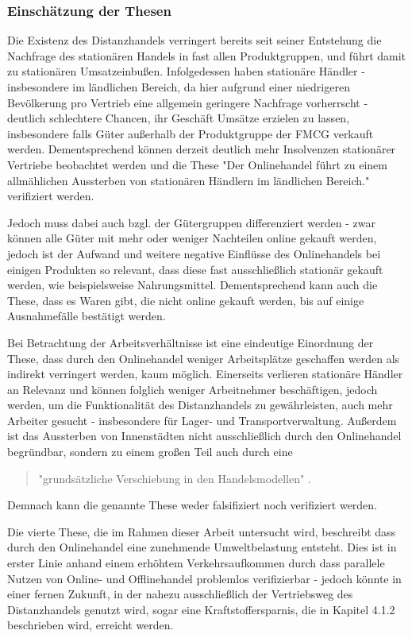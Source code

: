  
\subsubsection{Einschätzung der Thesen}

Die Existenz des Distanzhandels verringert bereits seit seiner Entstehung die Nachfrage des stationären Handels in fast allen Produktgruppen, und führt damit zu stationären Umsatzeinbußen. Infolgedessen haben stationäre Händler - insbesondere im ländlichen Bereich, da hier aufgrund einer niedrigeren Bevölkerung pro Vertrieb eine allgemein geringere Nachfrage vorherrscht - deutlich schlechtere Chancen, ihr Geschäft Umsätze erzielen zu lassen, insbesondere falls Güter außerhalb der Produktgruppe der \ac{FMCG} verkauft werden. Dementsprechend können derzeit deutlich mehr Insolvenzen stationärer Vertriebe beobachtet werden und die These "Der Onlinehandel führt zu einem allmählichen Aussterben von stationären Händlern im ländlichen Bereich." verifiziert werden.

Jedoch muss dabei auch bzgl. der Gütergruppen differenziert werden - zwar können alle Güter mit mehr oder weniger Nachteilen online gekauft werden, jedoch ist der Aufwand und weitere negative Einflüsse des Onlinehandels bei einigen Produkten so relevant, dass diese fast ausschließlich stationär gekauft werden, wie beispielsweise Nahrungsmittel. Dementsprechend kann auch die These, dass es Waren gibt, die nicht online gekauft werden, bis auf einige Ausnahmefälle bestätigt werden.

Bei Betrachtung der Arbeitsverhältnisse ist eine eindeutige Einordnung der These, dass durch den Onlinehandel weniger Arbeitsplätze geschaffen werden als indirekt verringert werden, kaum möglich. Einerseits verlieren stationäre Händler an Relevanz und können folglich weniger Arbeitnehmer beschäftigen, jedoch werden, um die Funktionalität des Distanzhandels zu gewährleisten, auch mehr Arbeiter gesucht - insbesondere für Lager- und Transportverwaltung. Außerdem ist das Aussterben von Innenstädten nicht ausschließlich durch den Onlinehandel begründbar, sondern zu einem großen Teil auch durch eine 
\begin{quote}
"grundsätzliche Verschiebung in den Handelsmodellen" \cite[S. 24]{evilcom}.
\end{quote}
Demnach kann die genannte These weder falsifiziert noch verifiziert werden.

Die vierte These, die im Rahmen dieser Arbeit untersucht wird, beschreibt dass durch den Onlinehandel eine zunehmende Umweltbelastung entsteht. Dies ist in erster Linie anhand einem erhöhtem Verkehrsaufkommen durch dass parallele Nutzen von Online- und Offlinehandel problemlos verifizierbar - jedoch könnte in einer fernen Zukunft, in der nahezu ausschließlich der Vertriebsweg des Distanzhandels genutzt wird, sogar eine Kraftstoffersparnis, die in Kapitel 4.1.2 beschrieben wird, erreicht werden.
